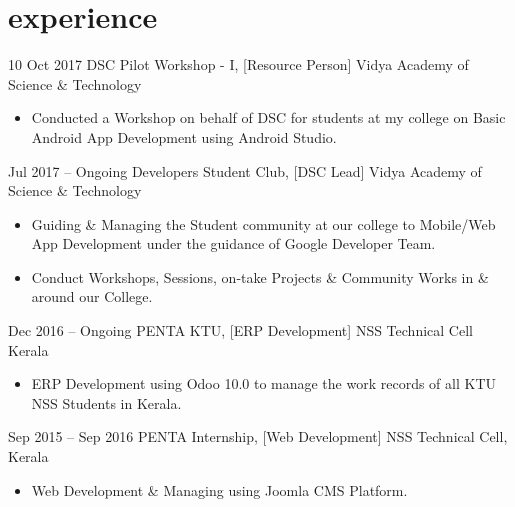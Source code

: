 \documentclass[]{friggeri-cv}
\begin{document}
\section{experience}
\begin{entrylist}

	\entry
	{10 Oct 2017}
	{DSC Pilot Workshop - I, [Resource Person]}
	{Vidya Academy of Science \& Technology}
	{\vspace{-3mm}\begin{itemize}[leftmargin=10pt,itemsep=4pt]
		\item Conducted a Workshop on behalf of DSC for students at my college on Basic Android App Development using Android Studio.
		\end{itemize}}
        
	      
	\entry
	{Jul 2017 – Ongoing}
	{Developers Student Club, [DSC Lead]}
	{Vidya Academy of Science \& Technology}
	{\vspace{-3mm}\begin{itemize}[leftmargin=10pt,itemsep=4pt]
		\item Guiding \& Managing the Student community at our college to Mobile/Web App Development under the guidance of Google Developer Team.
		\item Conduct Workshops, Sessions, on-take Projects \& Community Works in \& around our College.
		\end{itemize}}
	        
	      
	\entry
	{Dec 2016 – Ongoing}
	{PENTA KTU, [ERP Development]}
	{NSS Technical Cell Kerala}
	{\vspace{-3mm}\begin{itemize}[leftmargin=10pt,itemsep=4pt]
		\item ERP Development using Odoo 10.0 to manage the work records of all KTU NSS Students in Kerala.
		\end{itemize}}
	        
	      
	\entry
	{Sep 2015 – Sep 2016}
	{PENTA Internship, [Web Development]}
	{NSS Technical Cell, Kerala}
	{\vspace{-3mm}\begin{itemize}[leftmargin=10pt,itemsep=4pt]
		\item Web Development \& Managing using Joomla CMS Platform.
		\end{itemize}}
	        
\end{entrylist}
\newline
\end{document}
